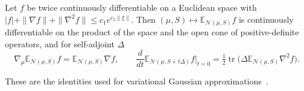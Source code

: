 \begin{lemma}\label{lem:llp_gaussian_gradients}
Let $f$ be twice continuously differentiable on a Euclidean space with $|f|+\|\nabla f\|+\|\nabla^2f\|\leq c_1e^{c_2\|\xi\|}$. Then $(\mu,S)\mapsto\mathbb E_{\mathcal N(\mu,S)}f$ is continuously differentiable on the product of the space and the open cone of positive-definite operators, and for self-adjoint $\Delta$
\begin{equation}
\nabla_\mu\mathbb E_{\mathcal N(\mu,S)}f=\mathbb E_{\mathcal N(\mu,S)}\nabla f,\qquad
\frac{d}{dt}\mathbb E_{\mathcal N(\mu,S+t\Delta)}f\Big|_{t=0}=\tfrac12\operatorname{tr}\bigl(\Delta\mathbb E_{\mathcal N(\mu,S)}\nabla^2f\bigr).
\label{eq:llp_bonnet_price}
\end{equation}
\end{lemma}

These are the identities used for variational Gaussian approximations~\cite{OpperArchambeau2009}.

